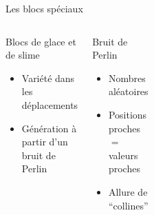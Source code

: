 \documentclass{beamer}
\begin{document}
{\begin{frame}{Les blocs spéciaux}
    \begin{columns}
        \begin{block}{Blocs de glace et de slime}
            \begin{itemize}
                \item[\bullet] Variété dans les déplacements
                \item[\bullet] Génération à partir d'un bruit de Perlin
            \end{itemize}
        \end{block}
        \begin{block}{Bruit de Perlin}
            \begin{itemize}
                \item[\bullet] Nombres aléatoires
                \item[\bullet] Positions proches $=$ valeurs proches
                \item[\bullet] Allure de ``collines''
            \end{itemize}
        \end{block}
        \begin{figure}
            \centering
            \includegraphics[width=0.4\textwidth]{perlin_noise_example}
        \end{figure}
        \begin{figure}
            \centering
            \includegraphics[width=1.0\textwidth]{perlin_noise_gradient}
        \end{figure}
        \begin{figure}

\end{figure}
\end{columns}
\end{frame}}
\end{document}
